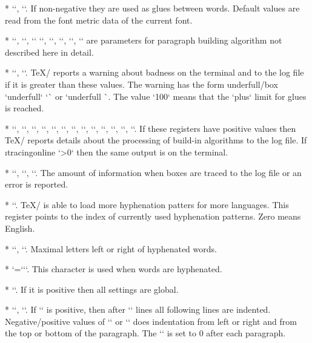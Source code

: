 {* \y`\spaceskip=0pt`,
  \y`\xspaceskip=0pt`. If non-negative they are used as glues between words.
  Default values are read from the font metric data of the current font.

* \y``,
  \y``, \y`\emergencystretch=0pt`
  \y``,
  \y``,
  \y``,
  \y`\hfuzz=0.1pt`,
  \y`\vfuzz=0.1pt`
are parameters for paragraph building algorithm not described here in
detail.

* \y``,
  \y``. \TeX/ reports a warning about \iid badness on the terminal
  and to the log file if it is greater than these values. The warning has the form
  \ii underfull/box `underfull` `\hbox` or `underfull \vbox`. The value `100`
  means that the `plus` limit for glues is reached.

* \y``,
  \y``,
  \y``,
  \y``,
  \y``,
  \y``,
  \y``,
  \y``,
  \y``,
  \y``, 
  \y``,
  \y``, 
  \y``. 
  If these registers have positive values then \TeX/ reports details about
  the processing of build-in
  algorithms to the log file. If \i tracingonline `\tracingonline>0` then the same
  output is on the terminal.

* \y``,
  \y``,
  \y``.
  The amount of information when boxes are traced to the log file or an error is
  reported.

* \y``. 
  \TeX/ is able to load more hyphenation patters for more
  languages. This register points to the index of currently used
  hyphenation patterns. Zero means English.

* \y``, \y``. Maximal letters left or right of
  hyphenated words.

* \y`=``\-`. This character is used when words are
  hyphenated.

* \y``. If it is positive then all settings are global.

* \y``,
  \y`\hangindent=0pt`.
  If \x`\hangindent` is positive, then after \x`\hangafter` lines all following
  lines are indented. Negative/positive values of \x`\hangindent` or \x`\hangafter` does
  indentation from left or right and from the top or bottom of the paragraph.
  The \x`\hangindet` is set to 0 after each paragraph.

}
